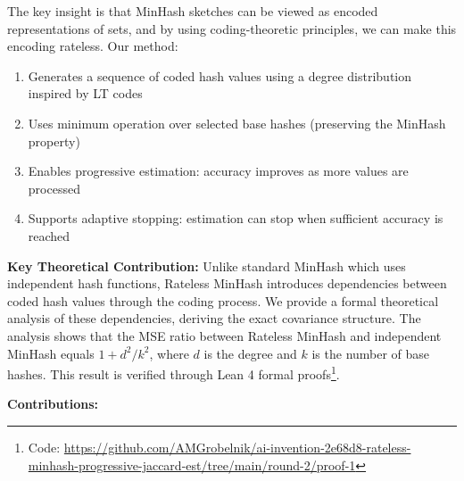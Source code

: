 \documentclass[11pt,letterpaper]{article}
\begin{document}
The key insight is that MinHash sketches can be viewed as encoded representations of sets, and by using coding-theoretic principles, we can make this encoding rateless. Our method:
\begin{enumerate}
    \item Generates a sequence of coded hash values using a degree distribution inspired by LT codes
    \item Uses minimum operation over selected base hashes (preserving the MinHash property)
    \item Enables progressive estimation: accuracy improves as more values are processed
    \item Supports adaptive stopping: estimation can stop when sufficient accuracy is reached
\end{enumerate}

\textbf{Key Theoretical Contribution:} Unlike standard MinHash which uses independent hash functions, Rateless MinHash introduces dependencies between coded hash values through the coding process. We provide a formal theoretical analysis of these dependencies, deriving the exact covariance structure. The analysis shows that the MSE ratio between Rateless MinHash and independent MinHash equals $1 + d^2/k^2$, where $d$ is the degree and $k$ is the number of base hashes. This result is verified through Lean 4 formal proofs\footnote{Code: \url{https://github.com/AMGrobelnik/ai-invention-2e68d8-rateless-minhash-progressive-jaccard-est/tree/main/round-2/proof-1}}.

\textbf{Contributions:}
\end{document}
